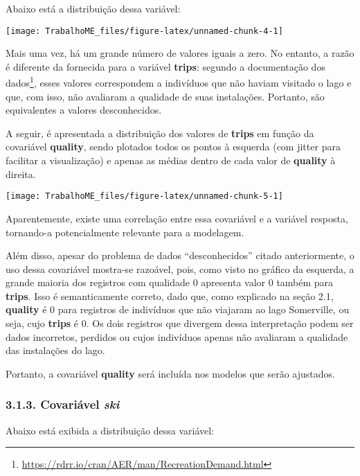 \documentclass[
]{article}
\begin{document}
Abaixo está a distribuição dessa variável:

\begin{center}\texttt{[image: TrabalhoME\_files/figure-latex/unnamed-chunk-4-1]} \end{center}

Mais uma vez, há um grande número de valores iguais a zero. No entanto,
a razão é diferente da fornecida para a variável \textbf{trips}: segundo
a documentação dos dados\footnote{\url{https://rdrr.io/cran/AER/man/RecreationDemand.html}},
esses valores correspondem a indivíduos que não haviam visitado o lago e
que, com isso, não avaliaram a qualidade de suas instalações. Portanto,
são equivalentes a valores desconhecidos.

A seguir, é apresentada a distribuição dos valores de \textbf{trips} em
função da covariável \textbf{quality}, sendo plotados todos os pontos à
esquerda (com jitter para facilitar a visualização) e apenas as médias
dentro de cada valor de \textbf{quality} à direita.

\begin{center}\texttt{[image: TrabalhoME\_files/figure-latex/unnamed-chunk-5-1]} \end{center}

Aparentemente, existe uma correlação entre essa covariável e a variável
resposta, tornando-a potencialmente relevante para a modelagem.

Além disso, apesar do problema de dados ``desconhecidos'' citado
anteriormente, o uso dessa covariável mostra-se razoável, pois, como
visto no gráfico da esquerda, a grande maioria dos registros com
qualidade \(0\) apresenta valor \(0\) também para \textbf{trips}. Isso é
semanticamente correto, dado que, como explicado na seção 2.1,
\textbf{quality} é \(0\) para registros de indivíduos que não viajaram
ao lago Somerville, ou seja, cujo \textbf{trips} é \(0\). Os dois
registros que divergem dessa interpretação podem ser dados incorretos,
perdidos ou cujos indivíduos apenas não avaliaram a qualidade das
instalações do lago.

Portanto, a covariável \textbf{quality} será incluída nos modelos que
serão ajustados.

\subsubsection{\texorpdfstring{3.1.3. Covariável
\emph{ski}}{3.1.3. Covariável ski}}\label{covariuxe1vel-ski}

Abaixo está exibida a distribuição dessa variável:
\end{document}
